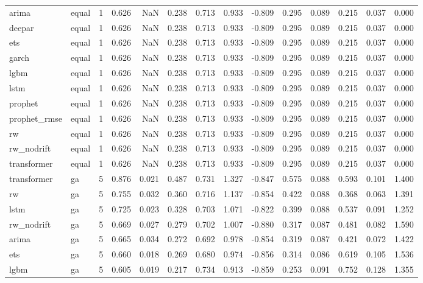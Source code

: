 \begin{table}
\begin{tabular}{llrrrrrrrrrrrr}
arima & equal & 1 & 0.626 & NaN & 0.238 & 0.713 & 0.933 & -0.809 & 0.295 & 0.089 & 0.215 & 0.037 & 0.000 \\
deepar & equal & 1 & 0.626 & NaN & 0.238 & 0.713 & 0.933 & -0.809 & 0.295 & 0.089 & 0.215 & 0.037 & 0.000 \\
ets & equal & 1 & 0.626 & NaN & 0.238 & 0.713 & 0.933 & -0.809 & 0.295 & 0.089 & 0.215 & 0.037 & 0.000 \\
garch & equal & 1 & 0.626 & NaN & 0.238 & 0.713 & 0.933 & -0.809 & 0.295 & 0.089 & 0.215 & 0.037 & 0.000 \\
lgbm & equal & 1 & 0.626 & NaN & 0.238 & 0.713 & 0.933 & -0.809 & 0.295 & 0.089 & 0.215 & 0.037 & 0.000 \\
lstm & equal & 1 & 0.626 & NaN & 0.238 & 0.713 & 0.933 & -0.809 & 0.295 & 0.089 & 0.215 & 0.037 & 0.000 \\
prophet & equal & 1 & 0.626 & NaN & 0.238 & 0.713 & 0.933 & -0.809 & 0.295 & 0.089 & 0.215 & 0.037 & 0.000 \\
prophet\_rmse & equal & 1 & 0.626 & NaN & 0.238 & 0.713 & 0.933 & -0.809 & 0.295 & 0.089 & 0.215 & 0.037 & 0.000 \\
rw & equal & 1 & 0.626 & NaN & 0.238 & 0.713 & 0.933 & -0.809 & 0.295 & 0.089 & 0.215 & 0.037 & 0.000 \\
rw\_nodrift & equal & 1 & 0.626 & NaN & 0.238 & 0.713 & 0.933 & -0.809 & 0.295 & 0.089 & 0.215 & 0.037 & 0.000 \\
transformer & equal & 1 & 0.626 & NaN & 0.238 & 0.713 & 0.933 & -0.809 & 0.295 & 0.089 & 0.215 & 0.037 & 0.000 \\
transformer & ga & 5 & 0.876 & 0.021 & 0.487 & 0.731 & 1.327 & -0.847 & 0.575 & 0.088 & 0.593 & 0.101 & 1.400 \\
rw & ga & 5 & 0.755 & 0.032 & 0.360 & 0.716 & 1.137 & -0.854 & 0.422 & 0.088 & 0.368 & 0.063 & 1.391 \\
lstm & ga & 5 & 0.725 & 0.023 & 0.328 & 0.703 & 1.071 & -0.822 & 0.399 & 0.088 & 0.537 & 0.091 & 1.252 \\
rw\_nodrift & ga & 5 & 0.669 & 0.027 & 0.279 & 0.702 & 1.007 & -0.880 & 0.317 & 0.087 & 0.481 & 0.082 & 1.590 \\
arima & ga & 5 & 0.665 & 0.034 & 0.272 & 0.692 & 0.978 & -0.854 & 0.319 & 0.087 & 0.421 & 0.072 & 1.422 \\
ets & ga & 5 & 0.660 & 0.018 & 0.269 & 0.680 & 0.974 & -0.856 & 0.314 & 0.086 & 0.619 & 0.105 & 1.536 \\
lgbm & ga & 5 & 0.605 & 0.019 & 0.217 & 0.734 & 0.913 & -0.859 & 0.253 & 0.091 & 0.752 & 0.128 & 1.355 \\

\end{tabular}
\end{table}
